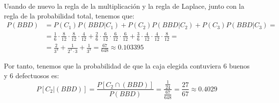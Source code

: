 \begin{ejercicio}
    Usando de nuevo la regla de la multiplicación y la regla de Laplace, junto con la regla de la probabilidad total, tenemos que:
    \begin{equation*}\begin{split}
        P(BBD)& = P(C_1)P(BBD|C_1) + P(C_2)P(BBD|C_2) + P(C_3)P(BBD|C_3)=\\
        &= \frac{1}{6}\cdot \frac{8}{12}\cdot \frac{8}{12}\cdot \frac{4}{12} + \frac{2}{6}\cdot \frac{6}{12}\cdot\frac{6}{12}\cdot\frac{6}{12} + \frac{3}{6}\cdot \frac{4}{12}\cdot\frac{4}{12}\cdot\frac{8}{12} =\\
        &= \frac{2}{3^4} + \frac{1}{2^3\cdot 3} + \frac{1}{3^3} = \frac{67}{648} \approx 0.103395
    \end{split}\end{equation*}

    Por tanto, tenemos que la probabilidad de que la caja elegida contuviera $6$ buenos y $6$ defectuosos es:
    \begin{equation*}
        P[C_2 | (BBD)] = \frac{P[C_2 \cap (BBD)]}{P(BBD)}
        = \frac{\frac{1}{24}}{\frac{67}{648}} = \frac{27}{67} \approx 0.4029
    \end{equation*}
    
\end{ejercicio}

